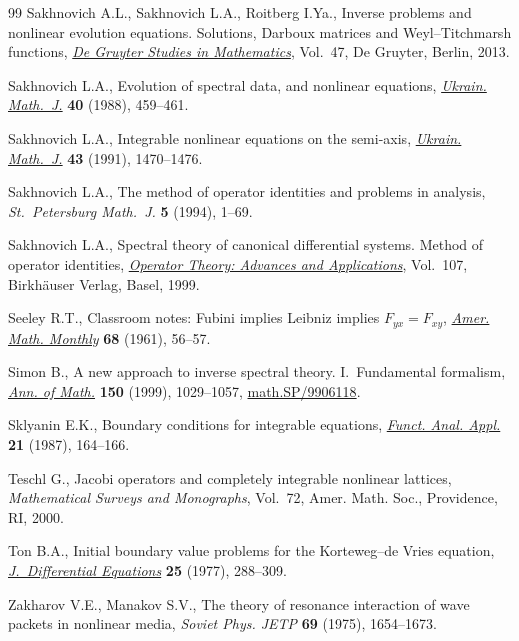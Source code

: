\documentclass[pdftex]{sigma}
\numberwithin{equation}{section}
\begin{document}
\begin{thebibliography}{99}
Sakhnovich A.L., Sakhnovich L.A., Roitberg I.Ya., Inverse problems and nonlinear
 evolution equations. Solutions, Darboux matrices and Weyl--Titchmarsh
 functions, \href{http://dx.doi.org/10.1515/9783110258615}{\textit{De Gruyter Studies in Mathematics}}, Vol.~47, De Gruyter,
 Berlin, 2013.

Sakhnovich L.A., Evolution of spectral data, and nonlinear equations,
 \href{http://dx.doi.org/10.1007/BF01057215}{\textit{Ukrain. Math.~J.}} \textbf{40} (1988), 459--461.

Sakhnovich L.A., Integrable nonlinear equations on the semi-axis,
 \href{http://dx.doi.org/10.1007/BF01067289}{\textit{Ukrain. Math.~J.}} \textbf{43} (1991), 1470--1476.

Sakhnovich L.A., The method of operator identities and problems in analysis,
 \textit{St.~Petersburg Math.~J.} \textbf{5} (1994), 1--69.

Sakhnovich L.A., Spectral theory of canonical dif\/ferential systems. {M}ethod of
 operator identities, \href{http://dx.doi.org/10.1007/978-3-0348-8713-7}{\textit{Operator Theory: Advances and Applications}},
 Vol.~107, Birkh\"auser Verlag, Basel, 1999.

Seeley R.T., Classroom notes: {F}ubini implies {L}eibniz implies {$F_{yx} =
 F_{xy}$}, \href{http://dx.doi.org/10.2307/2311366}{\textit{Amer. Math. Monthly}} \textbf{68} (1961), 56--57.

Simon B., A new approach to inverse spectral theory. {I}.~{F}undamental
 formalism, \href{http://dx.doi.org/10.2307/121061}{\textit{Ann. of Math.}} \textbf{150} (1999), 1029--1057,
 \href{http://arxiv.org/abs/math.SP/9906118}{math.SP/9906118}.

Sklyanin E.K., Boundary conditions for integrable equations, \href{http://dx.doi.org/10.1007/BF01078038}{\textit{Funct.
 Anal. Appl.}} \textbf{21} (1987), 164--166.

Teschl G., Jacobi operators and completely integrable nonlinear lattices,
 \textit{Mathematical Surveys and Monographs}, Vol.~72, Amer. Math. Soc.,
 Providence, RI, 2000.

Ton B.A., Initial boundary value problems for the {K}orteweg--de {V}ries
 equation, \href{http://dx.doi.org/10.1016/0022-0396(77)90046-8}{\textit{J.~Differential Equations}} \textbf{25} (1977), 288--309.

Zakharov V.E., Manakov S.V., The theory of resonance interaction of wave
 packets in nonlinear media, \textit{Soviet Phys. JETP} \textbf{69} (1975),
 1654--1673.


\end{thebibliography}
\end{document}
